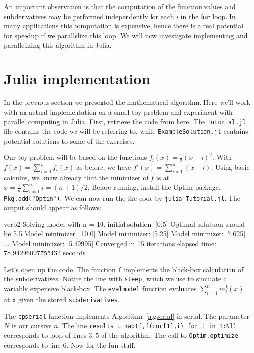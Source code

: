\documentclass[12pt]{article}
\theoremstyle{definition}
\begin{document}
An important observation is that the computation of the function values and subderivatives may be performed independently for each $i$ in the \textbf{for} loop. In many applications this computation is expensive, hence there is a real potential for speedup if we parallelize this loop. We will now investigate implementing and parallelizing this algorithm in Julia.

\section{Julia implementation}
In the previous section we presented the mathematical algorithm. Here we'll work with an actual implementation on a small toy problem and experiment with parallel computing in Julia. First, retrieve the code from \href{https://github.com/JuliaLang/IAP2013/tree/master/NumericalOptimization}{here}.
The \texttt{Tutorial.jl} file contains the code we will be referring to, while \texttt{ExampleSolution.jl} contains potential solutions to some of the exercises.

Our toy problem will be based on the functions $f_i(x) = \frac{1}{2}(x-i)^2$. With $f(x) = \sum_{i=1}^n f_i(x)$ as before, we have $f'(x) = \sum_{i=1}^n (x-i)$. Using basic calculus, we know already that the minimizer of $f$ is at $x = \frac{1}{n}\sum_{i=1}^n i = (n+1)/2$. Before running, install the Optim package, \texttt{Pkg.add("Optim")}. We can now run the the code by \texttt{julia Tutorial.jl}. The output should appear as follows:
\begin{center}
\begin{SaveVerbatim}{verb2}
Solving model with n = 10, initial solution: [0.5]
Optimal solutuon should be 5.5
Model minimizer: [10.0]
Model minimizer: [5.25]
Model minimizer: [7.625]
...
Model minimizer: [5.49995]
Converged in 15 iterations
elapsed time: 78.94296097755432 seconds
\end{SaveVerbatim}
\end{center}

Let's open up the code. The function \texttt{f} implements the black-box calculation of the subderivatives. Notice the line with \texttt{sleep}, which we use to simulate a variably expensive black-box. The \texttt{evalmodel} function evaluates $\sum_{i=1}^n m_i^k(x)$ at \texttt{x} given the stored \texttt{subderivatives}. 

The \texttt{cpserial} function implements Algorithm~\ref{algserial} in serial. The parameter $N$ is our cursive $n$. The line \texttt{results = map(f,[(cur[1],i) for i in 1:N])} corresponds to loop of lines 3--5 of the algorithm. The call to \texttt{Optim.optimize} corresponds to line 6. Now for the fun stuff.
\end{document}
